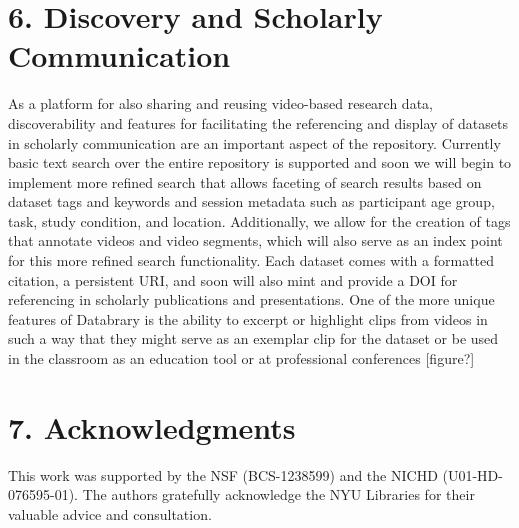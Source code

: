 \documentclass{sig-alternate}
\begin{document}
\section{6. Discovery and Scholarly Communication}

As a platform for also sharing and reusing video-based research data, discoverability and features for facilitating the referencing and display of datasets in scholarly communication are an important aspect of the repository. 
Currently basic text search over the entire repository is supported and soon we will begin to implement more refined search that allows faceting of search results based on dataset tags and keywords and session metadata such as participant age group, task, study condition, and location.
Additionally, we allow for the creation of tags that annotate videos and video segments, which will also serve as an index point for this more refined search functionality.  
Each dataset comes with a formatted citation, a persistent URI, and soon will also mint and provide a DOI for referencing in scholarly publications and presentations.
One of the more unique features of Databrary is the ability to excerpt or highlight clips from videos in such a way that they might serve as an exemplar clip for the dataset or be used in the classroom as an education tool or at professional conferences [figure?]

\section*{7. Acknowledgments}

This work was supported by the NSF (BCS-1238599) and the NICHD (U01-HD-076595-01).
The authors gratefully acknowledge the NYU Libraries for their valuable advice and consultation.



\end{document}
